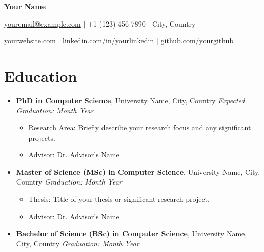\documentclass[letterpaper,10pt]{article}
\begin{document}
\pagestyle{empty} %


\begin{center}
    \textbf{\LARGE Your Name}
    
    \vspace{0.2cm}
    
    \href{mailto:youremail@example.com}{youremail@example.com} $\vert$ +1 (123) 456-7890 $\vert$ City, Country
    
    \vspace{0.2cm}
    
    \href{https://yourwebsite.com}{yourwebsite.com} $\vert$ \href{https://linkedin.com/in/yourlinkedin}{linkedin.com/in/yourlinkedin} $\vert$ \href{https://github.com/yourgithub}{github.com/yourgithub}
\end{center}


\section*{Education}

\begin{itemize}[leftmargin=*]

\item \textbf{PhD in Computer Science}, University Name, City, Country \hfill \textit{Expected Graduation: Month Year}
    \begin{itemize}
        \item Research Area: Briefly describe your research focus and any significant projects.
        \item Advisor: Dr. Advisor's Name
    \end{itemize}

\item \textbf{Master of Science (MSc) in Computer Science}, University Name, City, Country \hfill \textit{Graduation: Month Year}
    \begin{itemize}
        \item Thesis: Title of your thesis or significant research project.
        \item Advisor: Dr. Advisor's Name
    \end{itemize}

\item \textbf{Bachelor of Science (BSc) in Computer Science}, University Name, City, Country \hfill \textit{Graduation: Month Year}

\end{itemize}
\end{document}
